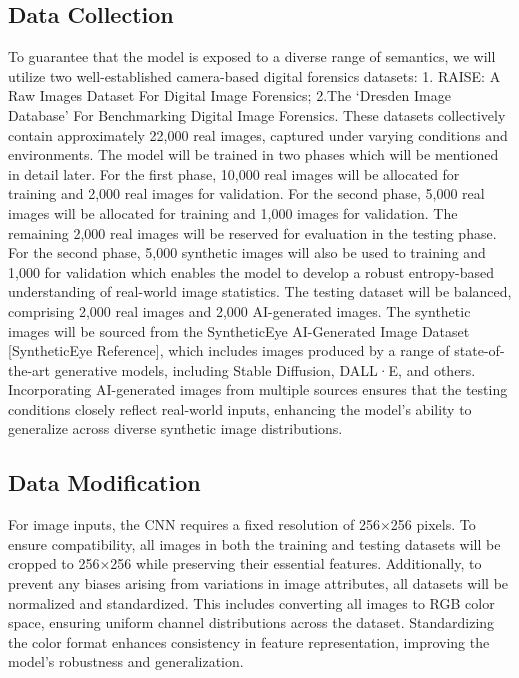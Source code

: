 \documentclass{article} %
\begin{document}
\subsection{Data Collection}
To guarantee that the model is exposed to a diverse range of semantics, we will utilize two well-established camera-based digital forensics datasets: 1. RAISE: A Raw Images Dataset For Digital Image Forensics; 2.The ‘Dresden Image Database’ For Benchmarking Digital Image Forensics. These datasets collectively contain approximately 22,000 real images, captured under varying conditions and environments. The model will be trained in two phases which will be mentioned in detail later. For the first phase, 10,000 real images will be allocated for training and 2,000 real images for validation. For the second phase, 5,000 real images will be allocated for training and 1,000 images for validation. The remaining 2,000 real images will be reserved for evaluation in the testing phase. For the second phase, 5,000 synthetic images will also be used to training and 1,000 for validation which enables the model to develop a robust entropy-based understanding of real-world image statistics.
The testing dataset will be balanced, comprising 2,000 real images and 2,000 AI-generated images. The synthetic images will be sourced from the SyntheticEye AI-Generated Image Dataset [SyntheticEye Reference], which includes images produced by a range of state-of-the-art generative models, including Stable Diffusion, DALL·E, and others. Incorporating AI-generated images from multiple sources ensures that the testing conditions closely reflect real-world inputs, enhancing the model's ability to generalize across diverse synthetic image distributions.

\subsection{Data Modification}
For image inputs, the CNN requires a fixed resolution of 256×256 pixels. To ensure compatibility, all images in both the training and testing datasets will be cropped to 256×256 while preserving their essential features.
Additionally, to prevent any biases arising from variations in image attributes, all datasets will be normalized and standardized. This includes converting all images to RGB color space, ensuring uniform channel distributions across the dataset. Standardizing the color format enhances consistency in feature representation, improving the model's robustness and generalization.
\end{document}
